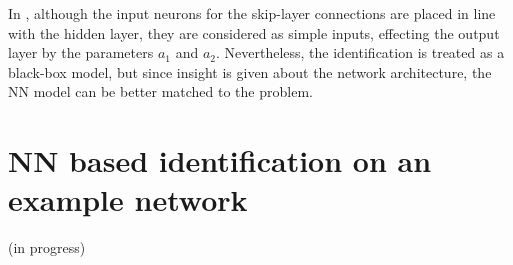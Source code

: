  \vspace{-3mm}

 In , although the input neurons for the skip-layer connections are placed in line with the hidden layer, they are considered as simple inputs, effecting the output layer by the parameters $a_1$ and $a_2$. Nevertheless, the identification is treated as a black-box model, but since insight is given about the network architecture, the NN model can be better matched to the problem. 

\section{NN based identification on an example network}
\label{NN_based_example} 

(in progress)